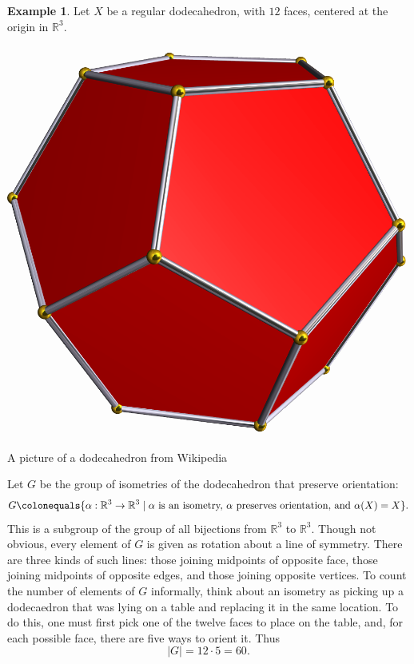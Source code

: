 \documentclass[12pt]{report}
\numberwithin{equation}{section}
\numberwithin{theorem}{chapter}
\theoremstyle{definition}
\newtheorem{example}[theorem]{Example}
\newtheorem*{basic properties}{Basic Properties}
\newtheorem*{Important Remark}{Important Remark}
\newcommand{\R}{\mathbb{R}}
\begin{document}
\begin{example} 
Let $X$ be a regular dodecahedron, with $12$ faces, centered at the origin in $\R^3$. 

\begin{center}
\includegraphics[scale=0.2]{Dodecahedron.png}

{\tiny A picture of a dodecahedron from Wikipedia}
\end{center}


Let $G$ be the group of isometries of the dodecahedron that preserve orientation:
$$G \colonequals \{\alpha : \R^3 \to \R^3 \mid \text{$\alpha$ is an isometry, $\alpha$ preserves orientation, and } \alpha(X) = X\}.$$
This is a subgroup of the group of all bijections from $\R^3$ to $\R^3$. Though not obvious, every element of $G$ is given as rotation about a line of symmetry. There are three kinds of such lines: those joining midpoints of opposite face, those joining midpoints of opposite edges, and those joining opposite vertices.  To count the number of elements of $G$ informally, think about an isometry as picking up a dodecaedron that was lying on a table and replacing it in the same location.  To do this, one must first pick one of the twelve faces to place on the table, and, for each possible face, there are five ways to orient it. Thus 
$$|G|=12 \cdot 5 = 60.$$


\end{example}
\end{document}
